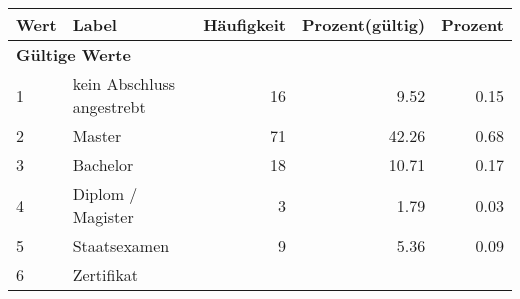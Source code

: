      \begin{longtable}{lXrrr}
     \toprule
     \textbf{Wert} & \textbf{Label} & \textbf{Häufigkeit} & \textbf{Prozent(gültig)} & \textbf{Prozent} \\
     \endhead
     \midrule
     \multicolumn{5}{l}{\textbf{Gültige Werte}}\\

     1 &
     \multicolumn{1}{X}{ kein Abschluss angestrebt   } &


       \num{16} &
       \num[round-mode=places,round-precision=2]{9.52} &
         \num[round-mode=places,round-precision=2]{0.15} \\

     2 &
     \multicolumn{1}{X}{ Master   } &


       \num{71} &
       \num[round-mode=places,round-precision=2]{42.26} &
         \num[round-mode=places,round-precision=2]{0.68} \\

     3 &
     \multicolumn{1}{X}{ Bachelor   } &


       \num{18} &
       \num[round-mode=places,round-precision=2]{10.71} &
         \num[round-mode=places,round-precision=2]{0.17} \\

     4 &
     \multicolumn{1}{X}{ Diplom / Magister   } &


       \num{3} &
       \num[round-mode=places,round-precision=2]{1.79} &
         \num[round-mode=places,round-precision=2]{0.03} \\

     5 &
     \multicolumn{1}{X}{ Staatsexamen   } &


       \num{9} &
       \num[round-mode=places,round-precision=2]{5.36} &
         \num[round-mode=places,round-precision=2]{0.09} \\

     6 &
     \multicolumn{1}{X}{ Zertifikat   } &



\end{longtable}
